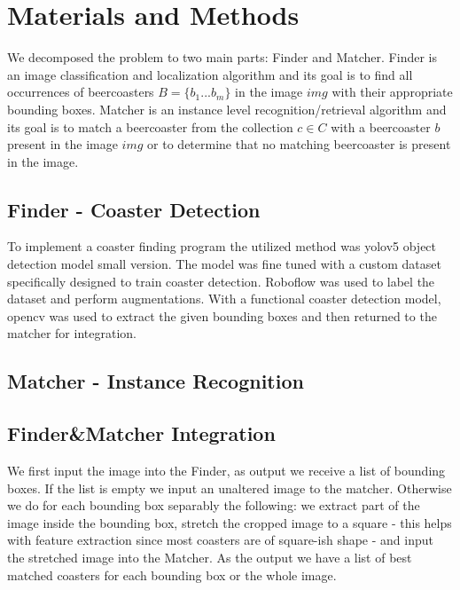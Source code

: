 \documentclass{article}
\begin{document}
\section{Materials and Methods}
We decomposed the problem to two main parts: Finder and Matcher.
Finder is an image classification and localization algorithm and its goal is to find all
occurrences of beercoasters $B=\{b_1...b_m\}$ in the image $img$ with their appropriate bounding boxes.
Matcher is an instance level recognition/retrieval algorithm and its goal is to match 
a beercoaster from the collection $c \in C$ with a beercoaster $b$ present in the image $img$
or to determine that no matching beercoaster is present in the image.

\subsection{Finder - Coaster Detection}

To implement a coaster finding program the utilized method was yolov5 object detection model small version. The model was fine tuned
with a custom dataset specifically designed to train coaster detection. Roboflow was used to label the dataset and perform augmentations.
With a functional coaster detection model, opencv was used to extract the given bounding boxes and then returned to the matcher for 
integration.

\subsection{Matcher - Instance Recognition}



\subsection{Finder\&Matcher Integration}

We first input the image into the Finder, as output we receive a list of bounding boxes.
If the list is empty we input an unaltered image to the matcher.
Otherwise we do for each bounding box separably the following: 
we extract part of the image inside the bounding box, 
stretch the cropped image to a square - this helps with feature extraction since most coasters are of square-ish shape - 
and input the stretched image into the Matcher.
As the output we have a list of best matched coasters for each bounding box or the whole image. 
\end{document}
